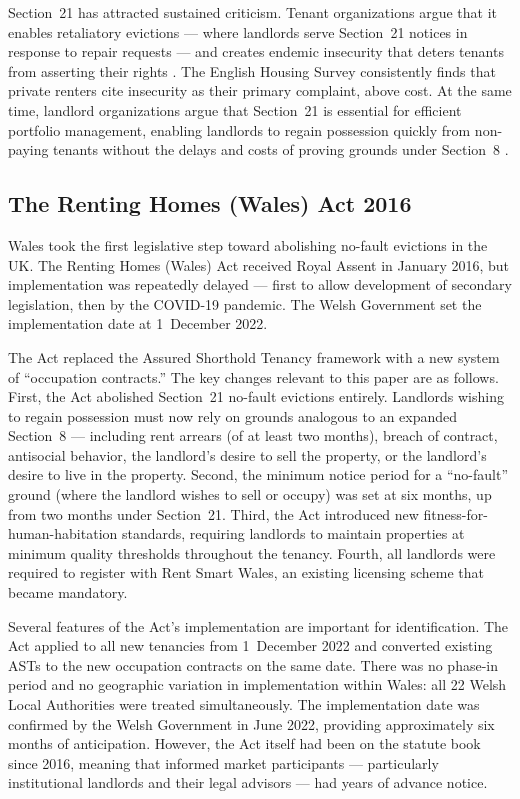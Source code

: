 \documentclass[12pt]{article}
\begin{document}
Section~21 has attracted sustained criticism. Tenant organizations argue that it enables retaliatory evictions --- where landlords serve Section~21 notices in response to repair requests --- and creates endemic insecurity that deters tenants from asserting their rights \citep{shelter2019eviction}. The English Housing Survey consistently finds that private renters cite insecurity as their primary complaint, above cost. At the same time, landlord organizations argue that Section~21 is essential for efficient portfolio management, enabling landlords to regain possession quickly from non-paying tenants without the delays and costs of proving grounds under Section~8 \citep{simcock2021landlord}.

\subsection{The Renting Homes (Wales) Act 2016}

Wales took the first legislative step toward abolishing no-fault evictions in the UK. The Renting Homes (Wales) Act received Royal Assent in January 2016, but implementation was repeatedly delayed --- first to allow development of secondary legislation, then by the COVID-19 pandemic. The Welsh Government set the implementation date at 1~December 2022.

The Act replaced the Assured Shorthold Tenancy framework with a new system of ``occupation contracts.'' The key changes relevant to this paper are as follows. First, the Act abolished Section~21 no-fault evictions entirely. Landlords wishing to regain possession must now rely on grounds analogous to an expanded Section~8 --- including rent arrears (of at least two months), breach of contract, antisocial behavior, the landlord's desire to sell the property, or the landlord's desire to live in the property. Second, the minimum notice period for a ``no-fault'' ground (where the landlord wishes to sell or occupy) was set at six months, up from two months under Section~21. Third, the Act introduced new fitness-for-human-habitation standards, requiring landlords to maintain properties at minimum quality thresholds throughout the tenancy. Fourth, all landlords were required to register with Rent Smart Wales, an existing licensing scheme that became mandatory.

Several features of the Act's implementation are important for identification. The Act applied to all new tenancies from 1~December 2022 and converted existing ASTs to the new occupation contracts on the same date. There was no phase-in period and no geographic variation in implementation within Wales: all 22 Welsh Local Authorities were treated simultaneously. The implementation date was confirmed by the Welsh Government in June 2022, providing approximately six months of anticipation. However, the Act itself had been on the statute book since 2016, meaning that informed market participants --- particularly institutional landlords and their legal advisors --- had years of advance notice.
\end{document}
